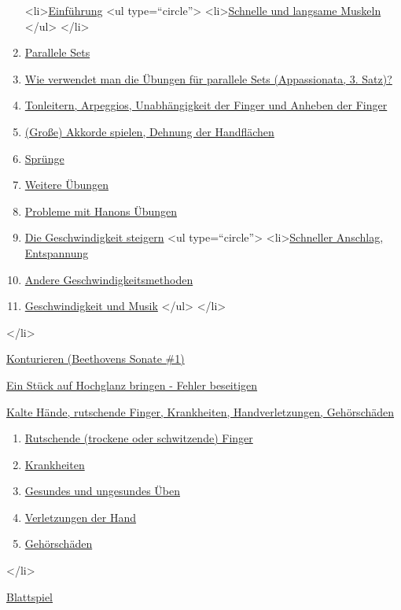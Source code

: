   \begin{enumerate}[label={\alph*.}] 
   <li>\hyperlink{c1iii7a}{Einführung}
    <ul type=\enquote{circle}>
      <li>\hyperlink{c1iii7aMuskeln}{Schnelle und langsame Muskeln}
    </ul>
   </li> 
   \item \hyperlink{c1iii7b}{Parallele Sets}
   \item \hyperlink{c1iii7c}{Wie verwendet man die Übungen für parallele Sets (Appassionata, 3. Satz)?}
   \item \hyperlink{c1iii7d}{Tonleitern, Arpeggios, Unabhängigkeit der Finger und Anheben der Finger}
   \item \hyperlink{c1iii7e}{(Große) Akkorde spielen, Dehnung der Handflächen}
   \item \hyperlink{c1iii7f}{Sprünge}
   \item \hyperlink{c1iii7g}{Weitere Übungen}
   \item \hyperlink{c1iii7h}{Probleme mit Hanons Übungen}
   \item \hyperlink{c1iii7i}{Die Geschwindigkeit steigern}
    <ul type=\enquote{circle}>
     <li>\hyperlink{c1iii7iAnschlag}{Schneller Anschlag, Entspannung}
     \item \hyperlink{c1iii7iAndere}{Andere Geschwindigkeitsmethoden}
     \item \hyperlink{c1iii7iMusik}{Geschwindigkeit und Musik}
    </ul>
   </li>
   \end{enumerate}
 </li>
 \item \hyperlink{c1iii8}{Konturieren (Beethovens Sonate \#1)}
 \item \hyperlink{c1iii9}{Ein Stück auf Hochglanz bringen - Fehler beseitigen}
 \item \hyperlink{c1iii10}{Kalte Hände, rutschende Finger, Krankheiten, Handverletzungen, Gehörschäden}
  \begin{enumerate}[label={\alph*.}] 
   <li>\hyperlink{c1iii10}{Kalte Hände}
   \item \hyperlink{c1iii10rutschen}{Rutschende (trockene oder schwitzende) Finger}
   \item \hyperlink{c1iii10krank}{Krankheiten}
   \item \hyperlink{c1iii10ungesund}{Gesundes und ungesundes Üben}
   \item \hyperlink{c1iii10hand}{Verletzungen der Hand}
   \item \hyperlink{c1iii10gehoer}{Gehörschäden}
   \end{enumerate}
 </li>
 \item \hyperlink{c1iii11}{Blattspiel}
